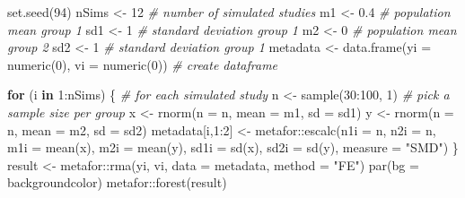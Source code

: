 \documentclass[
  oneside]{book}
\newenvironment{Shaded}{\begin{snugshade}}{\end{snugshade}}
\newcommand{\AttributeTok}[1]{\textcolor[rgb]{0.77,0.63,0.00}{#1}}
\newcommand{\CommentTok}[1]{\textcolor[rgb]{0.56,0.35,0.01}{\textit{#1}}}
\newcommand{\ControlFlowTok}[1]{\textcolor[rgb]{0.13,0.29,0.53}{\textbf{#1}}}
\newcommand{\DecValTok}[1]{\textcolor[rgb]{0.00,0.00,0.81}{#1}}
\newcommand{\FloatTok}[1]{\textcolor[rgb]{0.00,0.00,0.81}{#1}}
\newcommand{\FunctionTok}[1]{\textcolor[rgb]{0.00,0.00,0.00}{#1}}
\newcommand{\NormalTok}[1]{#1}
\newcommand{\OtherTok}[1]{\textcolor[rgb]{0.56,0.35,0.01}{#1}}
\newcommand{\SpecialCharTok}[1]{\textcolor[rgb]{0.00,0.00,0.00}{#1}}
\newcommand{\StringTok}[1]{\textcolor[rgb]{0.31,0.60,0.02}{#1}}
\begin{document}
\begin{Shaded}
\begin{Highlighting}[]
\FunctionTok{set.seed}\NormalTok{(}\DecValTok{94}\NormalTok{)}
\NormalTok{nSims }\OtherTok{\textless{}{-}} \DecValTok{12} \CommentTok{\# number of simulated studies}
\NormalTok{m1 }\OtherTok{\textless{}{-}} \FloatTok{0.4} \CommentTok{\# population mean group 1}
\NormalTok{sd1 }\OtherTok{\textless{}{-}} \DecValTok{1} \CommentTok{\# standard deviation group 1}
\NormalTok{m2 }\OtherTok{\textless{}{-}} \DecValTok{0} \CommentTok{\# population mean group 2}
\NormalTok{sd2 }\OtherTok{\textless{}{-}} \DecValTok{1} \CommentTok{\# standard deviation group 1}
\NormalTok{metadata }\OtherTok{\textless{}{-}} \FunctionTok{data.frame}\NormalTok{(}\AttributeTok{yi =} \FunctionTok{numeric}\NormalTok{(}\DecValTok{0}\NormalTok{), }\AttributeTok{vi =} \FunctionTok{numeric}\NormalTok{(}\DecValTok{0}\NormalTok{)) }\CommentTok{\# create dataframe}

\ControlFlowTok{for}\NormalTok{ (i }\ControlFlowTok{in} \DecValTok{1}\SpecialCharTok{:}\NormalTok{nSims) \{ }\CommentTok{\# for each simulated study}
\NormalTok{  n }\OtherTok{\textless{}{-}} \FunctionTok{sample}\NormalTok{(}\DecValTok{30}\SpecialCharTok{:}\DecValTok{100}\NormalTok{, }\DecValTok{1}\NormalTok{) }\CommentTok{\# pick a sample size per group}
\NormalTok{  x }\OtherTok{\textless{}{-}} \FunctionTok{rnorm}\NormalTok{(}\AttributeTok{n =}\NormalTok{ n, }\AttributeTok{mean =}\NormalTok{ m1, }\AttributeTok{sd =}\NormalTok{ sd1) }
\NormalTok{  y }\OtherTok{\textless{}{-}} \FunctionTok{rnorm}\NormalTok{(}\AttributeTok{n =}\NormalTok{ n, }\AttributeTok{mean =}\NormalTok{ m2, }\AttributeTok{sd =}\NormalTok{ sd2)}
\NormalTok{  metadata[i,}\DecValTok{1}\SpecialCharTok{:}\DecValTok{2}\NormalTok{] }\OtherTok{\textless{}{-}}\NormalTok{ metafor}\SpecialCharTok{::}\FunctionTok{escalc}\NormalTok{(}\AttributeTok{n1i =}\NormalTok{ n, }\AttributeTok{n2i =}\NormalTok{ n, }\AttributeTok{m1i =} \FunctionTok{mean}\NormalTok{(x), }
       \AttributeTok{m2i =} \FunctionTok{mean}\NormalTok{(y), }\AttributeTok{sd1i =} \FunctionTok{sd}\NormalTok{(x), }\AttributeTok{sd2i =} \FunctionTok{sd}\NormalTok{(y), }\AttributeTok{measure =} \StringTok{"SMD"}\NormalTok{)}
\NormalTok{\}}
\NormalTok{result }\OtherTok{\textless{}{-}}\NormalTok{ metafor}\SpecialCharTok{::}\FunctionTok{rma}\NormalTok{(yi, vi, }\AttributeTok{data =}\NormalTok{ metadata, }\AttributeTok{method =} \StringTok{"FE"}\NormalTok{)}
\FunctionTok{par}\NormalTok{(}\AttributeTok{bg =}\NormalTok{ backgroundcolor)}
\NormalTok{metafor}\SpecialCharTok{::}\FunctionTok{forest}\NormalTok{(result)}
\end{Highlighting}
\end{Shaded}
\end{document}
